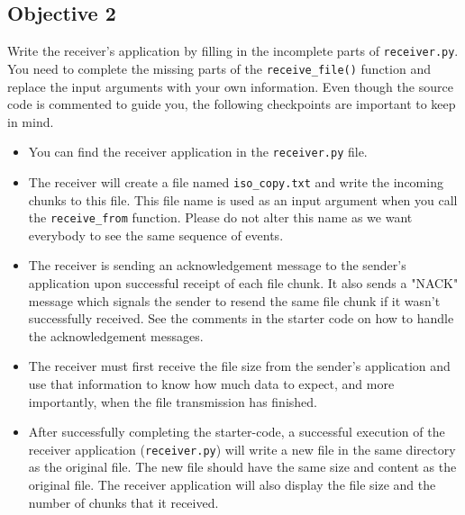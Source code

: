 \documentclass[11pt]{article}
\begin{document}

\subsection{Objective 2}
\label{subsec:obj2}
Write the receiver's application by filling in the incomplete parts of \texttt{receiver.py}.
You need to complete the missing parts of the \texttt{receive\_file()} function and replace the input arguments with your own information.
Even though the source code is commented to guide you, the following checkpoints are important to keep in mind.
\begin{itemize}
    \item You can find the receiver application in the \texttt{receiver.py} file.
    \item The receiver will create a file named \texttt{iso\_copy.txt} and write the incoming chunks to this file. This file name is used as an input argument when you call the \texttt{receive\_from} function. Please do not alter this name as we want everybody to see the same sequence of events.
    \item The receiver is sending an acknowledgement message to the sender's application upon successful receipt of each file chunk. It also sends a "NACK" message which signals the sender to resend the same file chunk if it wasn't successfully received. See the comments in the starter code on how to handle the acknowledgement messages.
    \item The receiver must first receive the file size from the sender's application and use that information to know how much data to expect, and more importantly, when the file transmission has finished.
    \item After successfully completing the starter-code, a successful execution of the receiver application (\texttt{receiver.py}) will write a new file in the same directory as the original file. The new file should have the same size and content as the original file. The receiver application will also display the file size and the number of chunks that it received.
\end{itemize}

\end{document}
